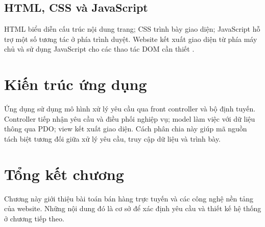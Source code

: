 \subsection{HTML, CSS và JavaScript}
HTML biểu diễn cấu trúc nội dung trang; CSS trình bày giao diện; JavaScript hỗ trợ một số tương tác ở phía trình duyệt. Website kết xuất giao diện từ phía máy chủ và sử dụng JavaScript cho các thao tác DOM cần thiết \cite{mdnweb}.

\section{Kiến trúc ứng dụng}
Ứng dụng sử dụng mô hình xử lý yêu cầu qua front controller và bộ định tuyến. Controller tiếp nhận yêu cầu và điều phối nghiệp vụ; model làm việc với dữ liệu thông qua PDO; view kết xuất giao diện. Cách phân chia này giúp mã nguồn tách biệt tương đối giữa xử lý yêu cầu, truy cập dữ liệu và trình bày.

\section{Tổng kết chương}
Chương này giới thiệu bài toán bán hàng trực tuyến và các công nghệ nền tảng của website. Những nội dung đó là cơ sở để xác định yêu cầu và thiết kế hệ thống ở chương tiếp theo.